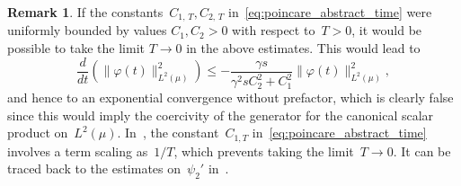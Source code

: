 \documentclass[10pt]{amsart}
\theoremstyle{definition}\newtheorem{defi}[theo]{Definition}\newtheorem{rema}[theo]{Remark}\newtheorem{exam}[theo]{Example}\newtheorem{exem}[theo]{Example}\newtheorem{nota}[theo]{Notation}
\renewcommand{\leq}{\leqslant}
\begin{document}
\begin{rema}\label{rmk:false}
If the constants~$C_{1,\,T},C_{2,\,T}$ in~\eqref{eq:poincare_abstract_time} were uniformly bounded by values $C_1,C_2>0$ with respect to~$T > 0$, it would be possible to take the limit $T \to 0$ in the above estimates. This would lead to
\[
\frac{d}{dt} \left(\|\varphi(t)\|_{L^2(\mu)}^2 \right) \leq -\frac{\gamma s}{\gamma^2 sC_{2}^2 + C_{1}^2} \|\varphi(t)\|_{L^2(\mu)}^2,
\]
and hence to an exponential convergence without prefactor, which is clearly false since this would imply the coercivity of the generator for the canonical scalar product on~$L^2(\mu)$. In~\cite{CLW19}, the constant~$C_{1,T}$ in~\eqref{eq:poincare_abstract_time} involves a term scaling as~$1/T$, which prevents taking the limit~$T \to 0$. It can be traced back to the estimates on~$\psi_2'$ in~\cite[Lemma~2.6]{CLW19}.
\end{rema}
\vspace{30pt}
\end{document}
